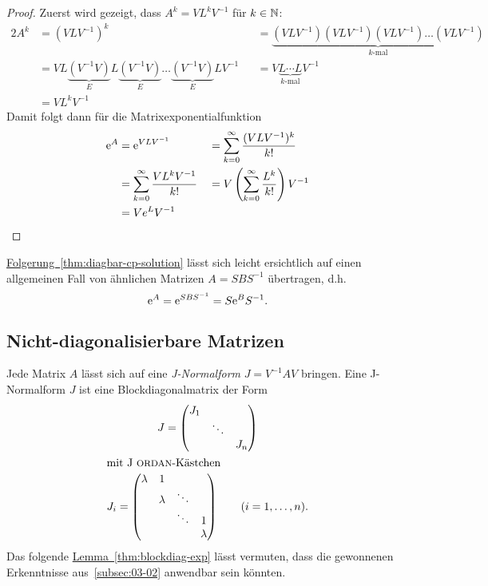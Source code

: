 \begin{proof}
    Zuerst wird gezeigt, dass $A^k = V L^k V^{-1}$ für $k \in \mathbb{N}$:
    \begin{alignat*}{2}
        A^k &= (V L V^{-1})^k &&= \underbrace{(V L V^{-1}) (V L V^{-1}) (V L V^{-1}) \dots (V L V^{-1})}_{k \text{-mal}}\\
            &= V L \underbrace{(V^{-1} V)}_{E} L \underbrace{(V^{-1} V)}_{E} \dots \underbrace{(V^{-1} V)}_{E} L V^{-1} &&= V \underbrace{L \cdots L}_{k \text{-mal}} V^{-1}\\
            &= V L^k V^{-1}
    \end{alignat*}
    Damit folgt dann für die Matrixexponentialfunktion
    \begin{alignat*}{2}
        \mathrm{e}^{A} &= \mathrm{e}^{V L V^{-1}} &&= \sum^\infty_{k=0} \frac{(V L V^{-1})^k}{k!}\\
               &= \sum^\infty_{k=0} \frac{V L^k V^{-1}}{k!} &&= V \left( \sum^\infty_{k=0} \frac{L^k}{k!} \right) V^{-1}\\
               &= V e^L V^{-1}
    \end{alignat*}
\end{proof}

\hyperref[thm:diagbar-cp-solution]{Folgerung~\ref*{thm:diagbar-cp-solution}} lässt sich leicht ersichtlich auf einen allgemeinen Fall von ähnlichen Matrizen $A = S B S^{-1}$ übertragen, d.h.
\begin{equation*}
    \mathrm{e}^A = \mathrm{e}^{S B S^{-1}} = S \mathrm{e}^B S^{-1}.
\end{equation*}

\subsection{Nicht-diagonalisierbare Matrizen}\label{subsec:03-03}
Jede Matrix $A$ lässt sich auf eine \emph{J-Normalform} $J = V^{-1} A V$ bringen.
Eine J-Normalform $J$ ist eine Blockdiagonalmatrix der Form
\begin{gather*}
    J = \begin{pmatrix}
            J_1 &        &  \\
                & \ddots & \\
                &        & J_n
    \end{pmatrix}\\
    \intertext{mit J\textc{ordan}-Kästchen}
    J_i = \begin{pmatrix}
              \lambda & 1       &        & \\
                      & \lambda & \ddots & \\
                      &         & \ddots & 1 \\
                      &         &        & \lambda
    \end{pmatrix}
    \qquad (i = 1,\dots,n).
\end{gather*}
Das folgende \hyperref[thm:blockdiag-exp]{Lemma~\ref*{thm:blockdiag-exp}} lässt vermuten,
dass die gewonnenen Erkenntnisse aus~\autoref{subsec:03-02} anwendbar sein könnten.

